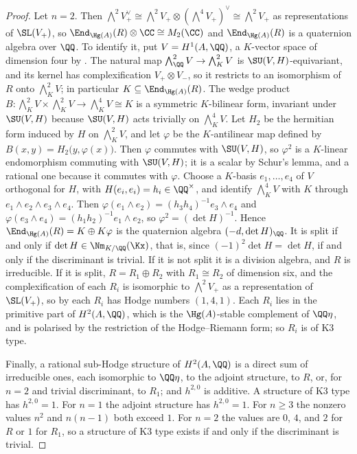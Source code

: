 \begin{proof}
Let $n=2$. Then $\bigwedge^{2}V_{+}^{\vee}\cong\bigwedge^{2}V_{+}\otimes
(\bigwedge^{4}V_{+})^{\vee}\cong\bigwedge^{2}V_{+}$ as representations of
$\SL(V_{+})$, so $\End_{\Hg(A)}(R)\otimes\CC\cong M_{2}(\CC)$ and
$\End_{\Hg(A)}(R)$ is a quaternion algebra over $\QQ$. To identify it, put
$V=H^{1}(A,\QQ)$, a $K$-vector space of dimension four by .
The natural map $\bigwedge^{2}_{\QQ}V\to\bigwedge^{2}_{K}V$ is
$\SU(V,H)$-equivariant, and its kernel has complexification
$V_{+}\otimes V_{-}$, so it restricts to an isomorphism of $R$ onto
$\bigwedge^{2}_{K}V$; in particular $K\subseteq\End_{\Hg(A)}(R)$. The wedge
product $B\colon\bigwedge^{2}_{K}V\times\bigwedge^{2}_{K}V\to
\bigwedge^{4}_{K}V\cong K$ is a symmetric $K$-bilinear form, invariant under
$\SU(V,H)$ because $\SU(V,H)$ acts trivially on $\bigwedge^{4}_{K}V$. Let
$H_{2}$ be the hermitian form induced by $H$ on $\bigwedge^{2}_{K}V$, and let
$\varphi$ be the $K$-antilinear map defined by
$B(x,y)=H_{2}\bigl(y,\varphi(x)\bigr)$. Then $\varphi$ commutes with
$\SU(V,H)$, so $\varphi^{2}$ is a $K$-linear endomorphism commuting with
$\SU(V,H)$; it is a scalar by Schur's lemma, and a rational one because it
commutes with $\varphi$. Choose a $K$-basis $e_{1},\dots,e_{4}$ of $V$
orthogonal for $H$, with $H(e_{i},e_{i})=h_{i}\in\QQ^{\times}$, and identify
$\bigwedge^{4}_{K}V$ with $K$ through $e_{1}\wedge e_{2}\wedge e_{3}\wedge
e_{4}$. Then $\varphi(e_{1}\wedge e_{2})=(h_{3}h_{4})^{-1}e_{3}\wedge e_{4}$
and $\varphi(e_{3}\wedge e_{4})=(h_{1}h_{2})^{-1}e_{1}\wedge e_{2}$, so
$\varphi^{2}=(\det H)^{-1}$. Hence $\End_{\Hg(A)}(R)=K\oplus K\varphi$ is the
quaternion algebra $(-d,\det H)_{\QQ}$. It is split if and only if
$\det H\in\Nm_{K/\QQ}(\Kx)$, that is, since $(-1)^{2}\det H=\det H$, if and
only if the discriminant is trivial. If it is not split it is a division
algebra, and $R$ is irreducible. If it is split, $R=R_{1}\oplus R_{2}$ with
$R_{1}\cong R_{2}$ of dimension six, and the complexification of each $R_{i}$
is isomorphic to $\bigwedge^{2}V_{+}$ as a representation of $\SL(V_{+})$, so
by  each $R_{i}$ has Hodge numbers $(1,4,1)$. Each $R_{i}$
lies in the primitive part of $H^{2}(A,\QQ)$, which is the $\Hg(A)$-stable
complement of $\QQ\eta$, and is polarised by the restriction of the
Hodge--Riemann form; so $R_{i}$ is of K3 type.

Finally, a rational sub-Hodge structure of $H^{2}(A,\QQ)$ is a direct sum of
irreducible ones, each isomorphic to $\QQ\eta$, to the adjoint structure, to
$R$, or, for $n=2$ and trivial discriminant, to $R_{1}$; and $h^{2,0}$ is
additive. A structure of K3 type has $h^{2,0}=1$. For $n=1$ the adjoint
structure has $h^{2,0}=1$. For $n\ge3$ the nonzero values $n^{2}$ and
$n(n-1)$ both exceed $1$. For $n=2$ the values are $0$, $4$, and $2$ for $R$
or $1$ for $R_{1}$, so a structure of K3 type exists if and only if the
discriminant is trivial.
\end{proof}

